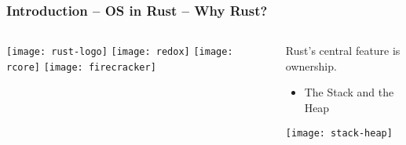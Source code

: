%
%
\begin{frame}[plain]
	\frametitle{Introduction -- OS in Rust -- Why Rust?}
	
	
	\begin{columns}
		
		\begin{column}{.2\textwidth}
			
			\texttt{[image: rust-logo]}
			\texttt{[image: redox]}
			\texttt{[image: rcore]}
			\texttt{[image: firecracker]}
		\end{column}
		
		\begin{column}{.8\textwidth}
			
						\Large
			
			Rust's central feature is ownership. 
			\begin{itemize}
			\item The Stack and the Heap
			\end{itemize}

			\texttt{[image: stack-heap]}
		\end{column}
		
		
	\end{columns}
	
	
\end{frame}

